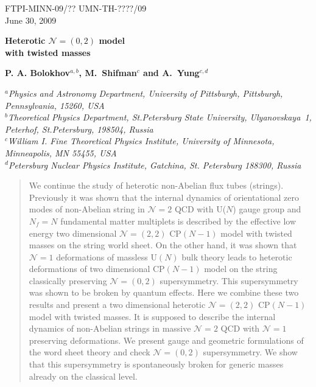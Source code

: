\documentclass[12pt]{article}
\newcommand{\ntwo}{${\mathcal N}=2$ }
\newcommand{\ntwot}{${\mathcal N}= \left(2,2\right) $ }
\newcommand{\ntwoo}{${\mathcal N}= \left(0,2\right) $ }
\newcommand{\none}{${\mathcal N}=1$ }
\begin{document}
\begin{titlepage}

\begin{flushright}
FTPI-MINN-09/?? UMN-TH-????/09\\
June 30, 2009
\end{flushright}

\begin{center}

{\Large \bf   Heterotic \ntwoo {}
model \\ with twisted masses
 }
\end{center}

\begin{center}
{\bf P. A. Bolokhov$^{a,b}$, M.~Shifman$^{c}$ and \bf A.~Yung$^{c,d}$}
\end {center}
\vspace{0.3cm}
\begin{center}

$^a${\it Physics and Astronomy Department, University of Pittsburgh, Pittsburgh, Pennsylvania, 15260, USA}\\
$^b${\it Theoretical Physics Department, St.Petersburg State University, Ulyanovskaya~1, 
	 Peterhof, St.Petersburg, 198504, Russia}\\
$^c${\it  William I. Fine Theoretical Physics Institute,
University of Minnesota,
Minneapolis, MN 55455, USA}\\
$^{d}${\it Petersburg Nuclear Physics Institute, Gatchina, St. Petersburg
188300, Russia}\\

\end{center}

\begin{abstract}

We continue the  study of heterotic non-Abelian  flux tubes (strings). Previously it was shown that the internal dynamics
of  orientational zero modes
of non-Abelian string in \ntwo QCD with U($N$) gauge group and 
$N_f=N$ fundamental matter multiplets is described by the
effective low energy two dimensional \ntwot CP$(N-1)$ model
with twisted masses on the string world sheet. On the other hand, it was shown that \none deformations of massless 
U$(N)$ bulk theory leads to  heterotic deformations
of two dimensional CP$(N-1)$ model on the string 
classically preserving
\ntwoo supersymmetry. This supersymmetry was shown to be broken 
by quantum effects. Here we combine these two results and
present a two dimensional heterotic \ntwot CP$(N-1)$ model
with twisted masses. It is supposed to describe the internal dynamics of non-Abelian strings in massive \ntwo QCD with
\none preserving deformations. We present gauge and geometric
formulations of the word sheet theory and check \ntwoo 
supersymmetry. We show that this supersymmetry is spontaneously
broken for generic masses already on the classical level.


 

\end{abstract}

\end{titlepage}
\end{document}
